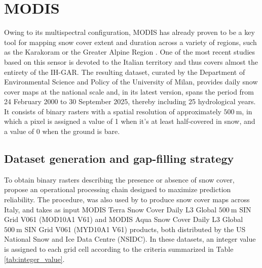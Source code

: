 \section{MODIS}
\label{sec:MODIS}

Owing to its multispectral configuration, MODIS has already proven to be a key tool for mapping snow cover extent and duration across a variety of 
regions, such as the Karakoram \parencite{MODIS_KARAKORAM} or the Greater Alpine Region \parencite{MODIS_GAR}. One of the most recent studies based on 
this sensor is devoted to the Italian territory \parencite{MODIS_ITA} and thus covers almost the entirety of the IH-GAR. The resulting dataset, curated 
by the Department of Environmental Science and Policy of the University of Milan, provides daily snow cover maps at the national scale and, in its latest 
version, spans the period from \num{24} February \num{2000} to \num{30} September \num{2025}, thereby including \num{25} hydrological years. It consists 
of binary rasters with a spatial resolution of approximately $\SI{500}{\meter}$, in which a pixel is assigned a value of 1 when it's at least half-covered 
in snow, and a value of 0 when the ground is bare.



\subsection{Dataset generation and gap-filling strategy}

To obtain binary rasters describing the presence or absence of snow cover, \textcite{MODIS_GAR} propose an operational processing chain designed to maximize 
prediction reliability. The procedure, was also used by \textcite{MODIS_ITA} to produce snow cover maps across Italy, and takes as input MODIS Terra Snow 
Cover Daily L3 Global $\SI{500}{\meter}$ SIN Grid V061 (MOD10A1 V61) and MODIS Aqua Snow Cover Daily L3 Global $\SI{500}{\meter}$ SIN Grid V061 (MYD10A1 
V61) products, both distributed by the US National Snow and Ice Data Centre (NSIDC). In these datasets, an integer value is assigned to each grid cell 
according to the criteria summarized in Table \ref{tab:integer_value}.

